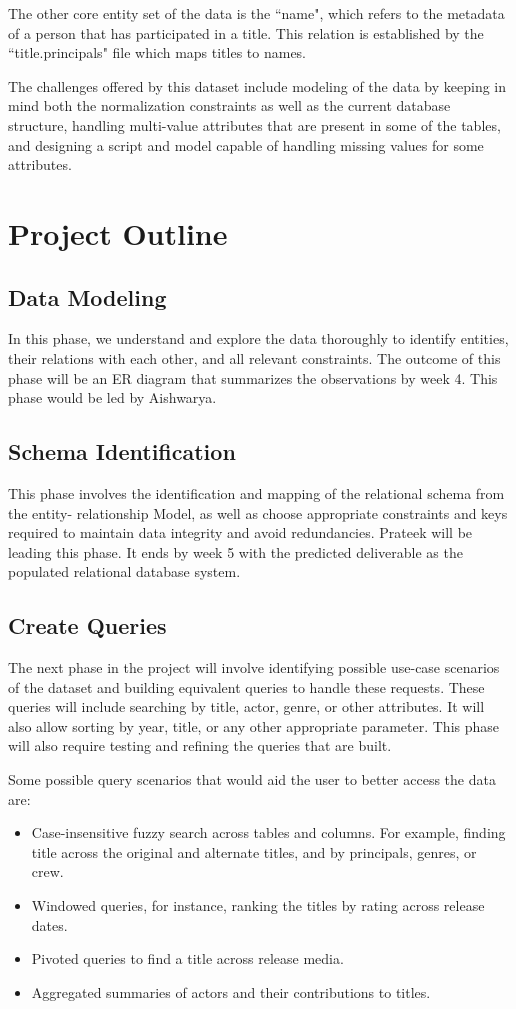 \documentclass{sig-alternate}
\begin{document}
The other core entity set of the data is the ``name", which refers to the metadata of a person that has participated in a title. This relation is established by the ``title.principals" file which maps titles to names.

The challenges offered by this dataset include modeling of the data by keeping in mind both the normalization constraints as well as the current database structure, handling multi-value attributes that are present in some of the tables, and designing a script and model capable of handling missing values for some attributes.
\section{Project Outline}
\subsection{Data Modeling}
In this phase, we understand and explore the data thoroughly to identify entities, their relations with each other, and all relevant constraints. The outcome of this phase will be an ER diagram that summarizes the observations by week 4. This phase would be led by Aishwarya.
\subsection{Schema Identification}
This phase involves the identification and mapping of the relational schema from the entity- relationship Model, as well as choose appropriate constraints and keys required to maintain data integrity and avoid redundancies. Prateek will be leading this phase. It ends by week 5 with the predicted deliverable as the populated relational database system.
\subsection{Create Queries}
The next phase in the project will involve identifying possible use-case scenarios of the dataset and building equivalent queries to handle these requests. These queries will include searching by title, actor, genre, or other attributes. It will also allow sorting by year, title, or any other appropriate parameter. This phase will also require testing and refining the queries that are built. 

Some possible query scenarios that would aid the user to better access the data are:
\begin{itemize}
    \item Case-insensitive fuzzy search across tables and columns. For example, finding title across the original and alternate titles, and by principals, genres, or crew.
    \item Windowed queries, for instance, ranking the titles by rating across release dates.
    \item Pivoted queries to find a title across release media.
    \item Aggregated summaries of actors and their contributions to titles.
\end{itemize}
\end{document}
